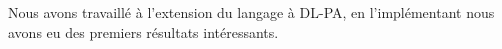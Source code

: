 Nous avons travaillé à l'extension du langage à DL-PA, en l'implémentant nous avons eu des premiers résultats intéressants.

